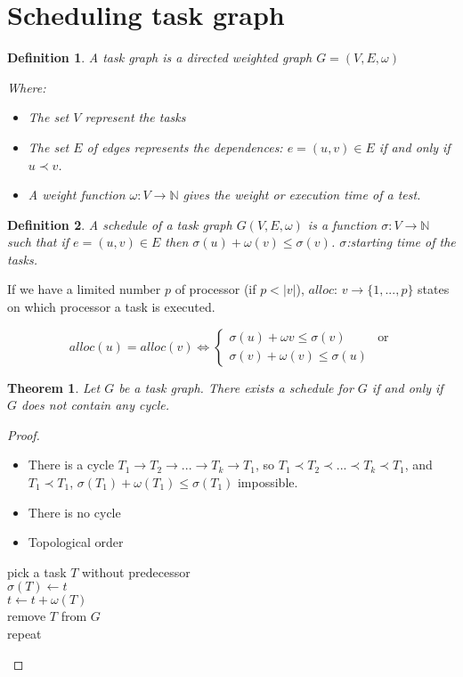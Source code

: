 \documentclass{article}
\newtheorem{thm}{Theorem}
\newtheorem{defi}{Definition}
\begin{document}
\section{Scheduling task graph}
\begin{defi}
A task graph is a directed weighted graph $G=(V,E,\omega )$

Where:
\begin{itemize}
\item The set $V$ represent the tasks
\item The set $E$ of edges represents the dependences: $e=(u,v) \in E $ if and only if $u\prec v$.
\item A weight function $\omega : V \to \mathbb{N} $ gives the weight or execution time of a test.
\end{itemize}
\end{defi}

\begin{defi}
A schedule of a task graph $G(V,E,\omega)$ is a function
$\sigma : V\to \mathbb{N}$ such that if $e=(u,v) \in E$ then $\sigma (u) + \omega (v) \leq \sigma (v)$. $\sigma$:starting time of the tasks.
\end{defi}

If we have a limited number $p$ of processor (if $p<|v|$), $alloc$: $v\to \{1,...,p\}$ states on which processor a task is executed.

\[alloc(u) = alloc (v) \Leftrightarrow 
\begin{cases}
\sigma(u) + \omega{v} \leq \sigma(v) & \text{or}\\
\sigma(v) + \omega(v) \leq \sigma(u)
\end{cases}\]

\begin{thm}
Let $G$ be a task graph. There exists a schedule for $G$ if and only if $G$ does not contain any cycle.
\end{thm}

\begin{proof}
\begin{itemize}
\item There is a cycle $T_1 \to T_2 \to ... \to T_k \to T_1$, so  $T_1 \prec T_2 \prec ... \prec T_k \prec T_1$, and $T_1\prec T_1$, $\sigma(T_1) + \omega(T_1) \leq \sigma(T_1)$ impossible.
\item There is no cycle
\item Topological order
\end{itemize}
\begin{algorithm}
pick a task $T$ without predecessor\\
$\sigma(T) \leftarrow t$\\
$t\leftarrow t + \omega(T)$\\
remove $T$ from $G$\\
repeat\\
\end{algorithm}
\end{proof}
\end{document}
